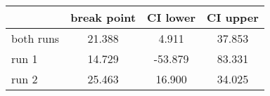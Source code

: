 \documentclass{article}
\begin{document}
\begin{table}[ht]
\centering
\begin{tabular}{lccc}
  \hline
 & break point & CI lower & CI upper \\ 
  \hline
both runs & 21.388 & 4.911 & 37.853 \\ 
  run 1 & 14.729 & -53.879 & 83.331 \\ 
  run 2 & 25.463 & 16.900 & 34.025 \\ 
   \hline
\end{tabular}
\end{table}
\end{document}
